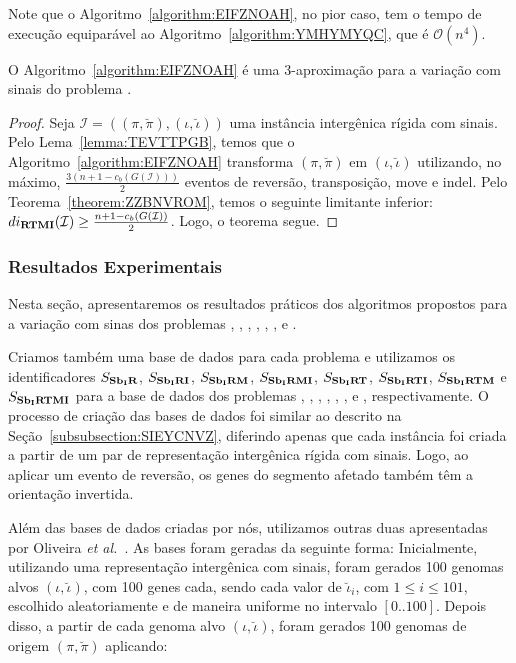 Note que o Algoritmo~\ref{algorithm:EIFZNOAH}, no pior caso, tem o tempo de execução equiparável ao Algoritmo~\ref{algorithm:YMHYMYQC}, que é $\mathcal{O}(n^4)$.

\begin{theorem}\label{theorem:ZQMAXKGA}
O Algoritmo~\ref{algorithm:EIFZNOAH} é uma $3$-aproximação para a variação com sinais do problema \SbIRTMI{}.
\end{theorem}
\begin{proof}
Seja $\mathcal{I} = ((\pi,\breve\pi),(\iota,\breve\iota))$ uma instância intergênica rígida com sinais. Pelo Lema~\ref{lemma:TEVTTPGB}, temos que o Algoritmo~\ref{algorithm:EIFZNOAH} transforma $(\pi,\breve\pi)$ em $(\iota,\breve\iota)$ utilizando, no máximo, $\frac{3(n+1 - c_b(G(\mathcal{I})))}{2}$ eventos de reversão, transposição, move e indel. Pelo Teorema~\ref{theorem:ZZBNVROM}, temos o seguinte limitante inferior: $di_{\textbf{RTMI}}(\mathcal{I}) \ge\frac{{n + 1} - c_b(G(\mathcal{I}))}{2}$. Logo, o teorema segue.
\end{proof}

\subsubsection{Resultados Experimentais}

Nesta seção, apresentaremos os resultados práticos dos algoritmos propostos para a variação com sinas dos problemas \SbIR{}, \SbIRI{}, \SbIRM{}, \SbIRMI{}, \SbIRT{}, \SbIRTI{}, \SbIRTM{} e \SbIRTMI{}.

Criamos também uma base de dados para cada problema e utilizamos os identificadores $S_{\textbf{Sb\textsubscript{I}R}}{}$, $S_{\textbf{Sb\textsubscript{I}RI}}{}$, $S_{\textbf{Sb\textsubscript{I}RM}}{}$, $S_{\textbf{Sb\textsubscript{I}RMI}}{}$, $S_{\textbf{Sb\textsubscript{I}RT}}{}$, $S_{\textbf{Sb\textsubscript{I}RTI}}{}$, $S_{\textbf{Sb\textsubscript{I}RTM}}{}$ e $S_{\textbf{Sb\textsubscript{I}RTMI}}{}$ para a base de dados dos problemas \SbIR{}, \SbIRI{}, \SbIRM{}, \SbIRMI{}, \SbIRT{}, \SbIRTI{}, \SbIRTM{} e \SbIRTMI{}, respectivamente. O processo de criação das bases de dados foi similar ao descrito na Seção~\ref{subsubsection:SIEYCNVZ}, diferindo apenas que cada instância foi criada a partir de um par de representação intergênica rígida com sinais. Logo, ao aplicar um evento de reversão, os genes do segmento afetado também têm a orientação invertida.

Além das bases de dados criadas por nós, utilizamos outras duas apresentadas por Oliveira \textit{et al.}~\cite{2021a-oliveira-etal}. As bases foram geradas da seguinte forma: Inicialmente, utilizando uma representação  intergênica com sinais, foram gerados 100 genomas alvos $(\iota,\breve\iota)$, com 100 genes cada, sendo cada valor de $\breve\iota_i$, com $1 \le i \le 101$, escolhido aleatoriamente e de maneira uniforme no intervalo $[0..100]$. Depois disso, a partir de cada genoma alvo $(\iota,\breve\iota)$, foram gerados 100 genomas de origem $(\pi,\breve\pi)$ aplicando:

